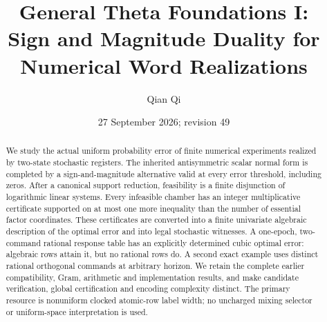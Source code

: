 \documentclass[11pt]{amsart}
\title[Sign and magnitude duality]{General Theta Foundations I:\\
Sign and Magnitude Duality for Numerical Word Realizations}
\author{Qian Qi}
\date{27 September 2026; revision 49}
\numberwithin{equation}{section}
\theoremstyle{definition}\newtheorem{definition}[theorem]{Definition}
\begin{document}
\begin{abstract}
We study the actual uniform probability error of finite numerical
experiments realized by two-state stochastic registers. The inherited
antisymmetric scalar normal form is completed by a sign-and-magnitude
alternative valid at every error threshold, including zeros. After a
canonical support reduction, feasibility is a finite disjunction of
logarithmic linear systems. Every infeasible chamber has an integer
multiplicative certificate supported on at most one more inequality
than the number of essential factor coordinates. These certificates
are converted into a finite univariate algebraic description of the
optimal error and into legal stochastic witnesses. A one-epoch,
two-command rational response table has an explicitly determined
cubic optimal error: algebraic rows attain it, but no rational rows
do. A second exact example uses distinct rational orthogonal commands
at arbitrary horizon. We retain the complete earlier compatibility,
Gram, arithmetic and implementation results, and make candidate
verification, global certification and encoding complexity distinct.
The primary resource is nonuniform clocked atomic-row label width;
no uncharged mixing selector or uniform-space interpretation is used.
\end{abstract}
\maketitle


















\end{document}

